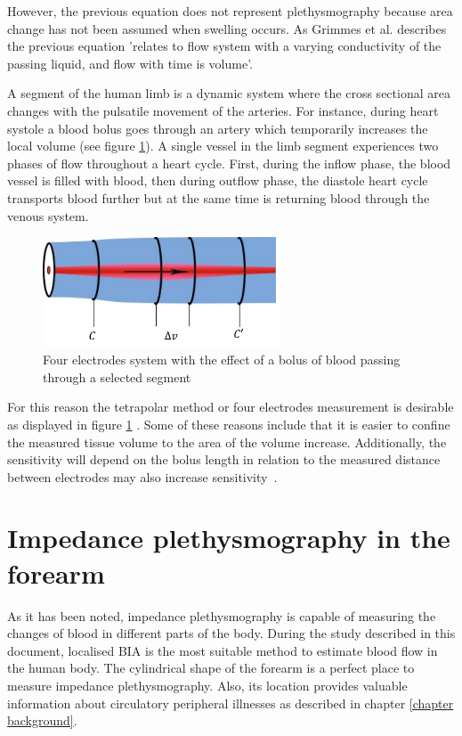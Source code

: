 However, the previous equation does not represent plethysmography because area change has not been assumed  when swelling occurs. As Grimmes et al. \cite{martinsen2011bioimpedance} describes the previous equation 'relates to flow system with a varying conductivity of the passing liquid, and flow with time is volume'.

A segment of the human limb is a dynamic system where the cross sectional area changes with the pulsatile movement of the arteries. For instance, during heart systole a blood bolus goes through an artery which temporarily increases the local volume (see figure \ref{fig:cylinder bolus}). A single vessel in the limb segment experiences two phases of flow throughout a heart cycle. First, during the inflow phase, the blood vessel is filled with blood, then during outflow phase, the diastole heart cycle transports blood further but at the same time is returning blood through the venous system.

\begin{figure}[!htpb]
	\centering
	\includegraphics[width=7cm,keepaspectratio]{figure6}    
	\caption[Four electrodes placement for iPG]{Four electrodes system with the effect of a bolus of blood passing through a selected segment}
	\label{fig:cylinder bolus}
\end{figure}

For this reason the tetrapolar method or four electrodes measurement is desirable as displayed in figure \ref{fig:cylinder bolus} \cite{young1967evaluation}. Some of these reasons include that it is easier to confine the measured tissue volume to the area of the volume increase. Additionally, the sensitivity will depend on the bolus length in relation to the measured distance between electrodes may also increase sensitivity~\cite{porter1985measurement}.

\section{Impedance plethysmography in the forearm}
\label{section impedance plethysmography}
As it has been noted, impedance plethysmography is capable of measuring the changes of blood in different parts of the body. During the study described in this document, localised BIA is the most suitable method to estimate blood flow in the human body. The cylindrical shape of the forearm is a perfect place to measure impedance plethysmography. Also, its location provides valuable information about circulatory peripheral illnesses as described in chapter \ref{chapter background}.

